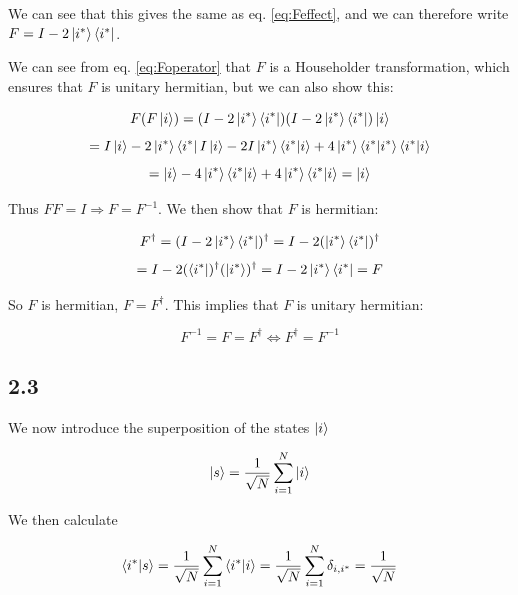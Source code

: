 \documentclass[a4paper,norsk, 10pt]{article}
\begin{document}
We can see that this gives the same as eq. \eqref{eq:Feffect}, and we can therefore write $F = I - 2\ket{i^*}\bra{i^*}$.

We can see from eq. \ref{eq:Foperator} that $F$ is a Householder transformation, which ensures that $F$ is unitary hermitian, but we can also show this:

\begin{equation*}
F(F\ket{i}) = (I - 2\ket{i^*}\bra{i^*})(I - 2\ket{i^*}\bra{i^*})\ket{i}
\end{equation*}
\begin{equation*}
= I\ket{i} - 2\ket{i^*}\bra{i^*}I\ket{i} -2I\ket{i^*}\bra{i^*}\ket{i} + 4\ket{i^*}\bra{i^*}\ket{i^*}\bra{i^*}\ket{i}
\end{equation*}
\begin{equation}
= \ket{i} - 4\ket{i^*}\bra{i^*}\ket{i} + 4\ket{i^*}\bra{i^*}\ket{i} = \ket{i}
\end{equation}

Thus $FF = I \Rightarrow F = F^{-1}$. We then show that $F$ is hermitian:

\begin{equation*}
F^\dagger = (I - 2\ket{i^*}\bra{i^*})^\dagger = I - 2(\ket{i^*}\bra{i^*})^\dagger
\end{equation*}
\begin{equation}
= I - 2(\bra{i^*})^\dagger(\ket{i^*})^\dagger = I - 2\ket{i^*}\bra{i^*} = F
\end{equation}

So $F$ is hermitian, $F = F^\dagger$. This implies that $F$ is unitary hermitian:

\begin{equation}
F^{-1} = F = F^\dagger \Leftrightarrow F^\dagger = F^{-1}
\end{equation}


\subsection{2.3}
We now introduce the superposition of the states $\ket{i}$

\begin{equation}
\ket{s} = \frac{1}{\sqrt{N}} \sum_{i=1}^N \ket{i}
\end{equation}

We then calculate 

\begin{equation}
\braket{i^*}{s} = \frac{1}{\sqrt{N}} \sum_{i=1}^N \braket{i^*}{i} = \frac{1}{\sqrt{N}} \sum_{i=1}^N \delta_{i,i^*} = \frac{1}{\sqrt{N}} 
\label{eq:is}
\end{equation}
\end{document}
